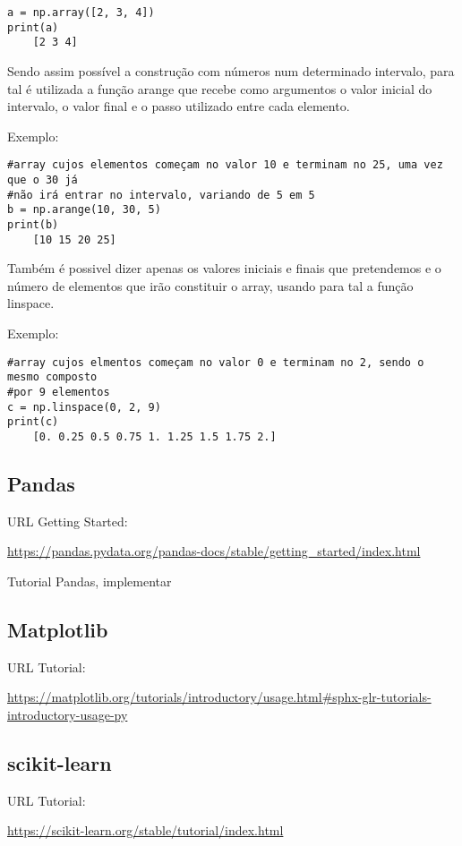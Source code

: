 \documentclass{article}
\begin{document}
\begin{lstlisting}
a = np.array([2, 3, 4])
print(a)
	[2 3 4]
\end{lstlisting}

Sendo assim poss\'ivel a construção com n\'umeros num determinado intervalo, para tal \'e utilizada a fun\c c\~ao arange que recebe como argumentos o valor inicial do intervalo, o valor final e o passo utilizado entre cada elemento.

Exemplo:

\begin{lstlisting}
#array cujos elementos começam no valor 10 e terminam no 25, uma vez que o 30 já 
#não irá entrar no intervalo, variando de 5 em 5
b = np.arange(10, 30, 5)
print(b)
	[10 15 20 25]
\end{lstlisting}

Tamb\'em \'e possivel dizer apenas os valores iniciais e finais que pretendemos e o n\'umero de elementos que ir\~ao constituir o array, usando para tal a fun\c c\~ao linspace.

Exemplo:

\begin{lstlisting}
#array cujos elmentos começam no valor 0 e terminam no 2, sendo o mesmo composto 
#por 9 elementos
c = np.linspace(0, 2, 9)
print(c)
	[0. 0.25 0.5 0.75 1. 1.25 1.5 1.75 2.]
\end{lstlisting}


\subsection{Pandas}
URL Getting Started:

\url{https://pandas.pydata.org/pandas-docs/stable/getting_started/index.html}

Tutorial Pandas, implementar


\subsection{Matplotlib}
URL Tutorial:

\url{https://matplotlib.org/tutorials/introductory/usage.html#sphx-glr-tutorials-introductory-usage-py}

\subsection{scikit-learn}
URL Tutorial:

\url{https://scikit-learn.org/stable/tutorial/index.html}
    
\end{document}

